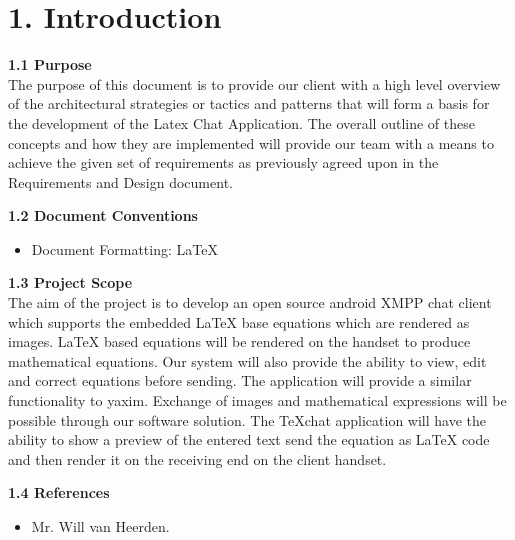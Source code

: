 \documentclass[29pt,a4paper]{moderncv}
\begin{document}
\newpage
	\section*{\textbf{1. Introduction}}
	\vspace{4mm}
	
		\textbf{1.1 Purpose}
			\\The purpose of this document is to provide our client with a high level overview of the architectural strategies or tactics and patterns that will form a basis for the development of the Latex Chat Application. The overall outline of these concepts and how they are implemented will provide our team with a means to achieve the given set of requirements as previously agreed upon in the Requirements and Design document.\\
		\vspace{1mm}
		
		\noindent \textbf{1.2 Document Conventions}
			\begin{itemize}
				\item Document Formatting: LaTeX
			\end{itemize}
		\vspace{5mm}
		
		\noindent \textbf{1.3 Project Scope}
			\\The aim of the project is to develop an open source android XMPP chat client which supports the embedded LaTeX base equations which are rendered as images. LaTeX based equations will be rendered on the handset to produce mathematical equations. Our system will also provide the ability to view, edit and correct equations before sending.
			\parindent 5mm The application will provide a similar functionality to yaxim. Exchange of images and mathematical expressions will be possible through our software solution. The TeXchat application will have the ability to show a preview of the entered text send the equation as LaTeX code and then render it on the receiving end on the client handset.
		\vspace{5mm}
		
	\noindent \textbf{1.4 References}
		\begin{itemize}
		\item Mr. Will van Heerden.
		\end{itemize}
		\vspace{5mm}
		
\end{document}
